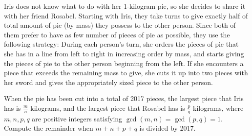 Iris does not know what to do with her 1-kilogram pie, so she decides to share it with her friend Rosabel. Starting with Iris, they take turns to give exactly half of total amount of pie (by mass) they possess to the other person. Since both of them prefer to have as few number of pieces of pie as possible, they use the following strategy: During each person's turn, she orders the pieces of pie that she has in a line from left to right in increasing order by mass, and starts giving the pieces of pie to the other person beginning from the left. If she encounters a piece that exceeds the remaining mass to give, she cuts it up into two pieces with her sword and gives the appropriately sized piece to the other person. 

When the pie has been cut into a total of 2017 pieces, the largest piece that Iris has is $\frac{m}{n}$ kilograms, and the largest piece that Rosabel has is $\frac{p}{q}$ kilograms, where $m,n,p,q$ are positive integers satisfying $\gcd(m,n)=\gcd(p,q)=1$. Compute the remainder when $m+n+p+q$ is divided by 2017.

